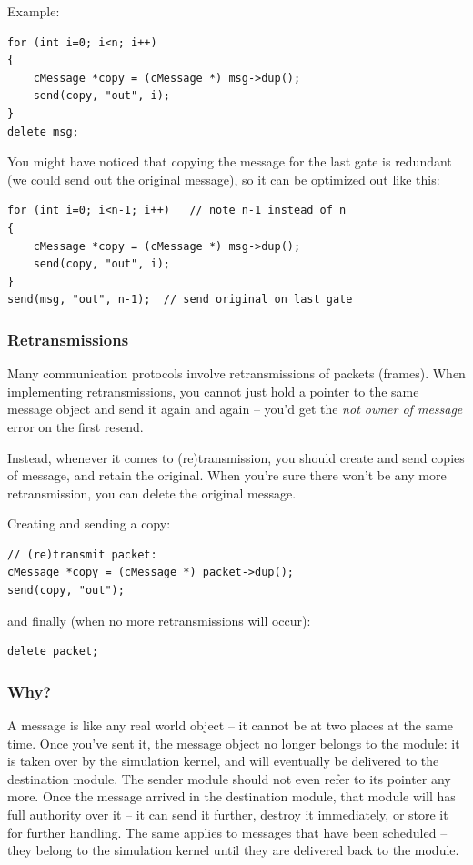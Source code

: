 Example:

\begin{verbatim}
for (int i=0; i<n; i++)
{
    cMessage *copy = (cMessage *) msg->dup();
    send(copy, "out", i);
}
delete msg;
\end{verbatim}

You might have noticed that copying the message for the last gate is
redundant (we could send out the original message),
so it can be optimized out like this:

\begin{verbatim}
for (int i=0; i<n-1; i++)   // note n-1 instead of n
{
    cMessage *copy = (cMessage *) msg->dup();
    send(copy, "out", i);
}
send(msg, "out", n-1);  // send original on last gate
\end{verbatim}


\subsubsection{Retransmissions}

Many communication protocols involve retransmissions of packets (frames).
When implementing retransmissions, you cannot just hold a pointer
to the same message object and send it again and again -- you'd get
the \textit{not owner of message} error on the first resend.

Instead, whenever it comes to (re)transmission, you should create and
send copies of message, and retain the original.
When you're sure there won't be any more retransmission,
you can delete the original message.

Creating and sending a copy:

\begin{verbatim}
// (re)transmit packet:
cMessage *copy = (cMessage *) packet->dup();
send(copy, "out");
\end{verbatim}

and finally (when no more retransmissions will occur):

\begin{verbatim}
delete packet;
\end{verbatim}


\subsubsection{Why?}

A message is like any real world object -- it cannot be at two places
at the same time. Once you've sent it, the message object
no longer belongs to the module: it is taken over by the simulation kernel,
and will eventually be delivered to the destination module.
The sender module should not even refer to its pointer any more.
Once the message arrived in the destination module, that module
will has full authority over it -- it can send it further,
destroy it immediately, or store it for further handling.
The same applies to messages that have been scheduled -- they
belong to the simulation kernel until they are delivered back to
the module.

